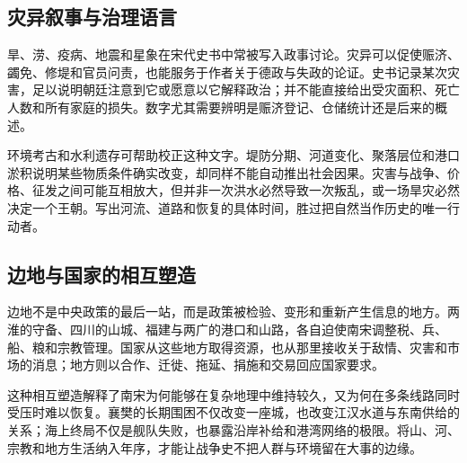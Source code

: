 \subsection{灾异叙事与治理语言}

旱、涝、疫病、地震和星象在宋代史书中常被写入政事讨论。灾异可以促使赈济、蠲免、修堤和官员问责，也能服务于作者关于德政与失政的论证。史书记录某次灾害，足以说明朝廷注意到它或愿意以它解释政治；并不能直接给出受灾面积、死亡人数和所有家庭的损失。数字尤其需要辨明是赈济登记、仓储统计还是后来的概述。

环境考古和水利遗存可帮助校正这种文字。堤防分期、河道变化、聚落层位和港口淤积说明某些物质条件确实改变，却同样不能自动推出社会因果。灾害与战争、价格、征发之间可能互相放大，但并非一次洪水必然导致一次叛乱，或一场旱灾必然决定一个王朝。写出河流、道路和恢复的具体时间，胜过把自然当作历史的唯一行动者。

\subsection{边地与国家的相互塑造}

边地不是中央政策的最后一站，而是政策被检验、变形和重新产生信息的地方。两淮的守备、四川的山城、福建与两广的港口和山路，各自迫使南宋调整税、兵、船、粮和宗教管理。国家从这些地方取得资源，也从那里接收关于敌情、灾害和市场的消息；地方则以合作、迁徙、拖延、捐施和交易回应国家要求。

这种相互塑造解释了南宋为何能够在复杂地理中维持较久，又为何在多条线路同时受压时难以恢复。襄樊的长期围困不仅改变一座城，也改变江汉水道与东南供给的关系；海上终局不仅是舰队失败，也暴露沿岸补给和港湾网络的极限。将山、河、宗教和地方生活纳入年序，才能让战争史不把人群与环境留在大事的边缘。
